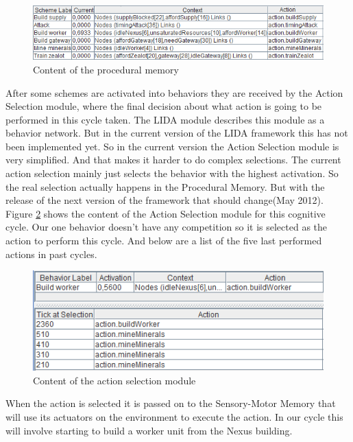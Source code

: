 \begin{figure}[h!tb]
\centering
\includegraphics[width=\textwidth]{graphics/procedural_memory.png}
\caption{Content of the procedural memory}
\label{fig:proceduralmemory}
\end{figure}

After some schemes are activated into behaviors they are received by the Action Selection module, where the final decision about what action is going to be performed in this cycle taken. The LIDA module describes this module as a behavior network\cite{maes1989right}. But in the current version of the LIDA framework this has not been implemented yet. So in the current version the Action Selection module is very simplified. And that makes it harder to do complex selections. The current action selection mainly just selects the behavior with the highest activation. So the real selection actually happens in the Procedural Memory. But with the release of the next version of the framework that should change(May 2012). Figure \ref{fig:actionselection} shows the content of the Action Selection module for this cognitive cycle. Our one behavior doesn't have any competition so it is selected as the action to perform this cycle. And below are a list of the five last performed actions in past cycles. 
\begin{figure}[h!tb]
\centering
\includegraphics[scale=1.0]{graphics/action_selection.png}
\caption{Content of the action selection module}
\label{fig:actionselection}
\end{figure}

When the action is selected it is passed on to the Sensory-Motor Memory that will use its actuators on the environment to execute the action. In our cycle this will involve starting to build a worker unit from the Nexus building. 